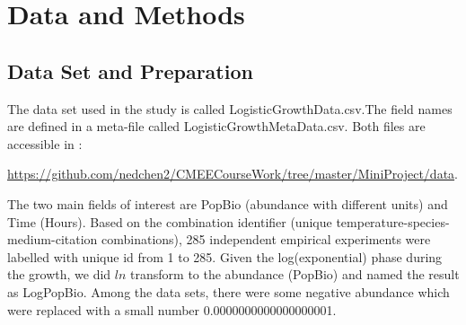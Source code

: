 \documentclass[11pt]{article}
\begin{document}
 \section{Data and Methods}
    \subsection{Data Set and Preparation}
    \linenumbers
    The data set used in the study is called LogisticGrowthData.csv.The field names are defined in a meta-file called LogisticGrowthMetaData.csv. Both files are accessible in :
   
    \href{https://github.com/nedchen2/CMEECourseWork/tree/master/MiniProject/data}{https://github.com/nedchen2/CMEECourseWork/tree/master/MiniProject/data}. 
   
    The two main fields of interest are PopBio (abundance with different units) and Time (Hours). Based on the combination identifier (unique temperature-species-medium-citation combinations), 285 independent empirical experiments were labelled with unique id from 1 to 285. Given the log(exponential) phase during the growth, we did $ln$ transform to the abundance (PopBio) and named the result as LogPopBio. Among the data sets, there were some negative abundance which were replaced with a small number 0.0000000000000000001.  

   
\end{document}
